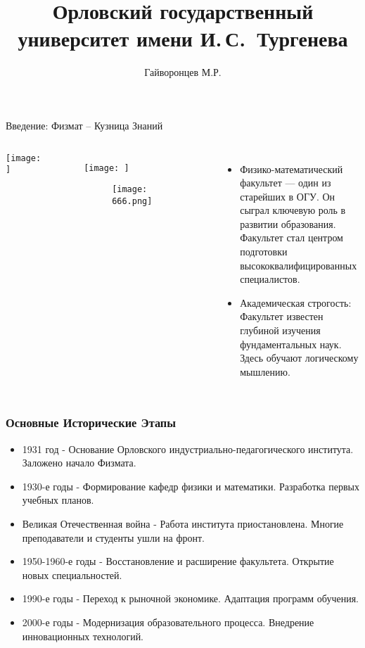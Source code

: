 \documentclass[pdf,hyperref={unicode}, aspectratio=43, serif,11pt]{beamer}
\title[Физико-математический факультет]{Орловский государственный
университет имени И.\,С.~Тургенева}
\author{Гайворонцев М.Р.}
\institute[]{Орловский государственный
университет имени И.\,С.~Тургенева}
\begin{document}
\begin{frame}
\titlepage
\end{frame}


\begin{frame}{Введение: Физмат – Кузница Знаний}
    \begin{columns}
        \texttt{[image: ]}

\begin{figure}
            \centering
            \texttt{[image: ]}
\begin{figure}
                \centering
                \texttt{[image: 666.png]}
                \label{fig:sub1}
            \end{figure}
            \label{fig:enter-label}
        \end{figure}

        \begin{itemize}
            \item Физико-математический факультет — один из старейших в ОГУ. Он сыграл ключевую роль в развитии образования. Факультет стал центром подготовки высококвалифицированных специалистов.
            \item Академическая строгость: Факультет известен глубиной изучения фундаментальных наук. Здесь обучают логическому мышлению.
        \end{itemize}
    \end{columns}
\end{frame}

\begin{frame}
\frametitle{\textbf{Основные Исторические Этапы}}
\begin{itemize}
    \item {\small 1931 год - Основание Орловского индустриально-педагогического института. Заложено начало Физмата.}
    \item {\small 1930-е годы - Формирование кафедр физики и математики. Разработка первых учебных планов.}
    \item {\small Великая Отечественная война - Работа института приостановлена. Многие преподаватели и студенты ушли на фронт.}
    \item {\small 1950-1960-е годы - Восстановление и расширение факультета. Открытие новых специальностей.}
    \item {\small 1990-е годы - Переход к рыночной экономике. Адаптация программ обучения.}
    \item {\small 2000-е годы - Модернизация образовательного процесса. Внедрение инновационных технологий.}
\end{itemize}
\end{frame}
\end{document}
